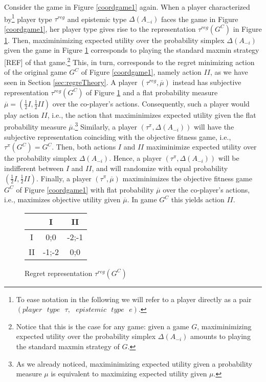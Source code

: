 \documentclass[fleqn,reqno,11pt]{article}
\begin{document}
\begin{example}
  Consider the game in Figure \ref{coordgame1} again. When a player characterized
  by\footnote{To ease notation in the following we will refer to a player directly as a pair
    $(player \text{ } type \text{ } \tau,\text{ } epistemic\text{ } type \text{ } e)$.} player
  type $ \tau^{reg} $ and epistemic type $ \Delta(A_{-i}) $ faces the game in Figure
  \ref{coordgame1}, her player type gives rise to the representation $\tau^{reg}(G^C)$ in
  Figure \ref{coordgame1reg}. Then, maximinimizing expected utility over the probability
  simplex $ \Delta(A_{-i}) $ given the game in Figure \ref{coordgame1reg} corresponds to
  playing the standard maxmin strategy [REF] of that game.\footnote{Notice that this is the
    case for any game: given a game $G$, maximinimizing expected utility over the probability
    simplex $ \Delta(A_{-i}) $ amounts to playing the standard maxmin strategy of $G$.} This,
  in turn, corresponds to the regret minimizing action of the original game $G^C$ of Figure
  \ref{coordgame1}, namely action $II$, as we have seen in Section \ref{sec:regreTheory}. A
  player $(\tau^{reg},\overline{\mu})$ instead has subjective representation $\tau^{reg}(G^C)$
  of Figure \ref{coordgame1reg} and a flat probability measure
  $\overline{\mu}=(\frac{1}{2}I,\frac{1}{2}II)$ over the co-player's actions. Consequently,
  such a player would play action $II$, i.e., the action that maximinimizes expected utility
  given the flat probability measure $\overline{\mu}$.\footnote{As we already noticed,
    maximinimizing expected utility given a probability measure $\mu$ is equivalent to
    maximizing expected utility given $\mu$.}  Similarly, a player
  $(\tau^{\pi},\Delta(A_{-i}))$ will have the subjective representation coinciding with the
  objective fitness game, i.e., $ \tau^{\pi}(G^C)= G^C $. Then, both actions $I$ and $II$
  maximinimize expected utility over the probability simplex $ \Delta(A_{-i}) $. Hence, a
  player $(\tau^{\pi},\Delta(A_{-i}))$ will be indifferent between $I$ and $II$, and will
  randomize with equal probability $(\frac{1}{2}I,\frac{1}{2}II)$. Finally, a player
  $(\tau^{\pi},\overline{\mu})$ maximinimizes the objective fitness game $G^C$ of Figure
  \ref{coordgame1} with flat probability $\overline{\mu}$ over the co-player's actions, i.e.,
  maximizes objective utility given $\overline{\mu}$. In game $G^C$ this yields action $II$.



\begin{figure}
\begin{center}%
\begin{tabular}{|c|c|c|}
\hline 
 & I & II\tabularnewline
\hline 
\hline 
I & 0;0 & -2;-1\tabularnewline
\hline 
II & -1;-2 & 0;0\tabularnewline
\hline 
\end{tabular}\end{center}

\protect\caption{Regret representation $\tau^{reg}(G^C)$}
\label{coordgame1reg}
\end{figure}

\end{example}
\end{document}
